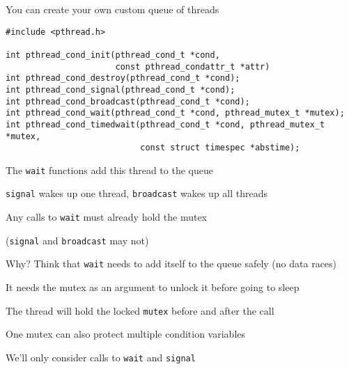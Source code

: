   \begin{slide}


    You can create your own custom queue of threads
    \medskip

    \begin{verbatim}
#include <pthread.h>

int pthread_cond_init(pthread_cond_t *cond,
                      const pthread_condattr_t *attr)
int pthread_cond_destroy(pthread_cond_t *cond);
int pthread_cond_signal(pthread_cond_t *cond);
int pthread_cond_broadcast(pthread_cond_t *cond);
int pthread_cond_wait(pthread_cond_t *cond, pthread_mutex_t *mutex);
int pthread_cond_timedwait(pthread_cond_t *cond, pthread_mutex_t *mutex,
                           const struct timespec *abstime);
    \end{verbatim}
    \medskip

    The \texttt{wait} functions add this thread to the queue

    \leftspace{}\texttt{signal} wakes up one thread, \texttt{broadcast} wakes
    up all threads

  \end{slide}

  \begin{slide}


    Any calls to \texttt{wait} must already hold the mutex

    \leftspace{}(\texttt{signal} and \texttt{broadcast} may not)
    \medskip

    Why? Think that \texttt{wait} needs to add itself to the queue safely (no
    data races)

    \leftspace{}It needs the mutex as an argument to unlock it before going to
    sleep

    \leftspace{}\leftspace{}The thread will hold the locked \texttt{mutex}
    before and after
    the call
    \medskip

    One mutex can also protect multiple condition variables
    \medskip

    We'll only consider calls to \texttt{wait} and \texttt{signal}

  \end{slide}

